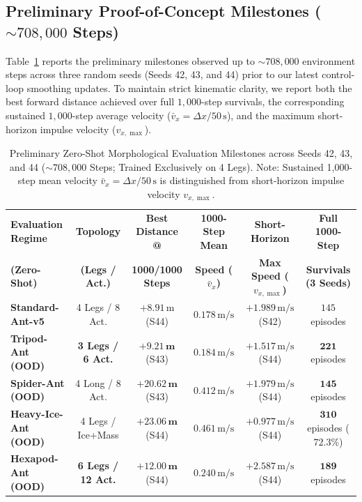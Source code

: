 \documentclass[11pt,a4paper]{article}
\begin{document}
\subsection{Preliminary Proof-of-Concept Milestones ($\sim 708,000$ Steps)}
Table~\ref{tab:results} reports the preliminary milestones observed up to $\sim 708,000$ environment steps across three random seeds (Seeds 42, 43, and 44) prior to our latest control-loop smoothing updates. To maintain strict kinematic clarity, we report both the best forward distance achieved over full $1,000$-step survivals, the corresponding sustained $1,000$-step average velocity ($\bar{v}_x = \Delta x / 50\,\text{s}$), and the maximum short-horizon impulse velocity ($v_{x,\max}$).

\begin{table}[htbp]
\centering
\caption{Preliminary Zero-Shot Morphological Evaluation Milestones across Seeds 42, 43, and 44 ($\sim 708,000$ Steps; Trained Exclusively on 4 Legs). Note: Sustained 1,000-step mean velocity $\bar{v}_x = \Delta x / 50\,\text{s}$ is distinguished from short-horizon impulse velocity $v_{x,\max}$.}
\label{tab:results}
\renewcommand{\arraystretch}{1.2}
\begin{tabular}{@{}lccccc@{}}
\toprule
\textbf{Evaluation Regime} & \textbf{Topology} & \textbf{Best Distance @} & \textbf{1000-Step Mean} & \textbf{Short-Horizon} & \textbf{Full 1000-Step} \\
\textbf{(Zero-Shot)} & \textbf{(Legs / Act.)} & \textbf{1000/1000 Steps} & \textbf{Speed ($\bar{v}_x$)} & \textbf{Max Speed ($v_{x,\max}$)} & \textbf{Survivals (3 Seeds)} \\
\midrule
\textbf{Standard-Ant-v5} & 4 Legs / 8 Act. & $+8.91\,\text{m}$ (S44) & $0.178\,\text{m/s}$ & $+1.989\,\text{m/s}$ (S42) & $145$ episodes \\
\textbf{Tripod-Ant (OOD)} & \textbf{3 Legs / 6 Act.} & $\mathbf{+9.21\,\text{m}}$ (S43) & $0.184\,\text{m/s}$ & $+1.517\,\text{m/s}$ (S44) & $\mathbf{221}$ episodes \\
\textbf{Spider-Ant (OOD)} & 4 Long / 8 Act. & $\mathbf{+20.62\,\text{m}}$ (S43)\footnotemark & $0.412\,\text{m/s}$ & $+1.979\,\text{m/s}$ (S44) & $\mathbf{145}$ episodes \\
\textbf{Heavy-Ice-Ant (OOD)} & 4 Legs / Ice+Mass & $\mathbf{+23.06\,\text{m}}$ (S44) & $0.461\,\text{m/s}$ & $+0.977\,\text{m/s}$ (S44) & $\mathbf{310}$ episodes ($72.3\%$) \\
\textbf{Hexapod-Ant (OOD)} & \textbf{6 Legs / 12 Act.} & $\mathbf{+12.00\,\text{m}}$ (S44) & $0.240\,\text{m/s}$ & $+2.587\,\text{m/s}$ (S44) & $\mathbf{189}$ episodes \\
\bottomrule
\end{tabular}
\end{table}
\end{document}
